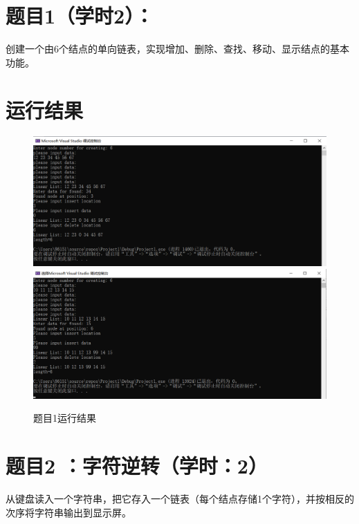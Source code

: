 \section{题目1（学时2）：}
创建一个由6个结点的单向链表，实现增加、删除、查找、移动、显示结点的基本功能。
\\


\section{运行结果}
\begin{figure}[ht]

    \centering
    \includegraphics[scale=0.6]{图片1.png}
    \includegraphics[scale=0.6]{图片2.png}
    \caption{题目1运行结果}
    \label{fig:label}
    \end{figure}
\section{题目2 ：字符逆转（学时：2）}
从键盘读入一个字符串，把它存入一个链表（每个结点存储1个字符），并按相反的次序将字符串输出到显示屏。



